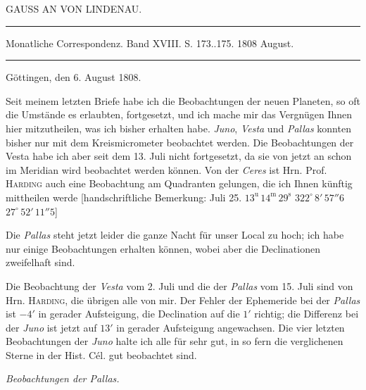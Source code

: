 \clearpage
{}
\begin{center}
GAUSS AN VON LINDENAU.
\end{center}

\hrule
\begin{center}
\fontsize{10}{12}\selectfont Monatliche Correspondenz. Band XVIII. S. 173..175. 1808 August.
\end{center}
\hrule

\begin{flushright}
Göttingen, den 6. August 1808.
\end{flushright}

\par\indent Seit meinem letzten Briefe habe ich die Beobachtungen der neuen Planeten, so oft die Umstände
es erlaubten, fortgesetzt, und ich mache mir das Vergnügen Ihnen hier mitzutheilen, was ich bisher
erhalten habe. \emph{Juno}, \emph{Vesta} und \emph{Pallas} konnten bisher nur mit dem Kreismicrometer beobachtet werden.
Die Beobachtungen der Vesta habe ich aber seit dem 13. Juli nicht fortgesetzt, da sie von jetzt an schon
im Meridian wird beobachtet werden können. Von der \emph{Ceres} ist Hrn. Prof. \textsc{Harding} auch eine Beobachtung am Quadranten gelungen, die ich Ihnen künftig mittheilen werde [handschriftliche Bemerkung:
Juli 25. $13^{\text{u}}\,14^{\text{m}}\,29^{\text{s}}$ \quad $322^\circ\,8'\,57''6$ \quad $27^\circ\,52'\,11''5$]

\par\indent Die \emph{Pallas} steht jetzt leider die ganze Nacht für unser Local zu hoch; ich habe nur einige Beobachtungen erhalten können, wobei aber die Declinationen zweifelhaft sind.

\par\indent Die Beobachtung der \emph{Vesta} vom 2. Juli und die der \emph{Pallas} vom 15. Juli sind von Hrn. \textsc{Harding},
die übrigen alle von mir. Der Fehler der Ephemeride bei der \emph{Pallas} ist $-4'$ in gerader Aufsteigung,
die Declination auf die $1'$ richtig; die Differenz bei der \emph{Juno} ist jetzt auf $13'$ in gerader Aufsteigung
angewachsen. Die vier letzten Beobachtungen der \emph{Juno} halte ich alle für sehr gut, in so fern die verglichenen Sterne in der Hist. Cél. gut beobachtet sind.

\begin{center}
\emph{Beobachtungen der Pallas.}
\end{center}


